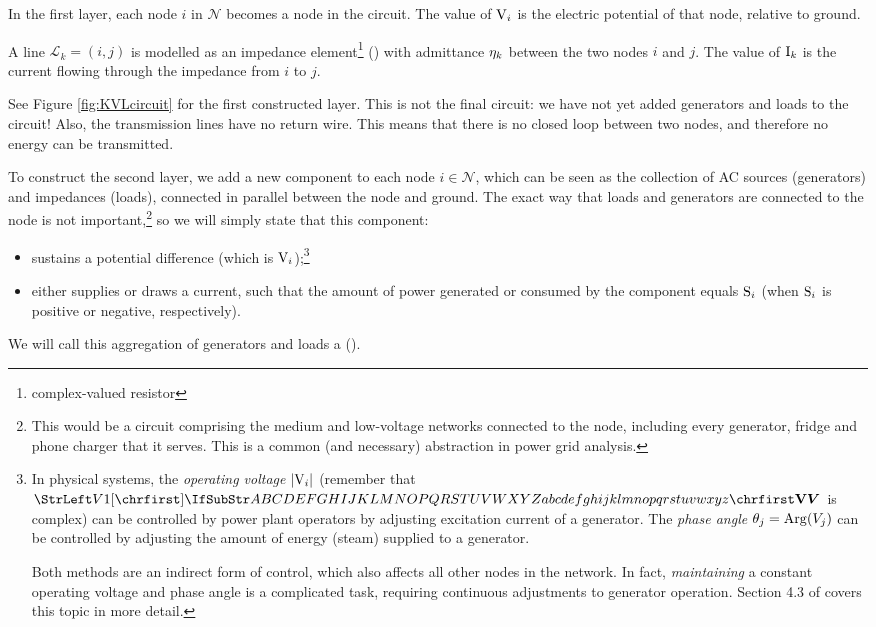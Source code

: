 \documentclass[main.tex]{subfiles}
\begin{document}
In the first layer, each node $i$ in $\mathcal{N}$ becomes a node in the circuit. The value of ${\mathrm{V}}_i$ is the electric potential of that node, relative to ground.

A line $\mathcal{L}_k=(i,j)$ is modelled as an impedance element\footnote{complex-valued resistor} (\inlineres) with admittance ${\mathrm{\eta}}_k$ between the two nodes $i$ and $j$. The value of ${\mathrm{I}}_k$ is the current flowing through the impedance from $i$ to $j$.

See Figure \ref{fig:KVLcircuit} for the first constructed layer. This is not the final circuit: we have not yet added generators and loads to the circuit! Also, the transmission lines have no return wire. This means that there is no closed loop between two nodes, and therefore no energy can be transmitted.

To construct the second layer, we add a new component to each node $i \in \mathcal{N}$, which can be seen as the collection of AC sources (generators) and impedances (loads), connected in parallel between the node and ground. The exact way that loads and generators are connected to the node is not important,\footnote{This would be a circuit comprising the medium and low-voltage networks connected to the node, including every generator, fridge and phone charger that it serves. This is a common (and necessary) abstraction in power grid analysis.} so we will simply state that this component:
\begin{itemize}
    \item sustains a potential difference (which is ${\mathrm{V}}_i$);\footnote{In physical systems, the \emph{operating voltage} $|{\mathrm{V}}_i|$ (remember that $\mat{V}$ is complex) can be controlled by power plant operators by adjusting excitation current of a generator. The \emph{phase angle} $\theta_j=\operatorname{Arg}(V_j)$ can be controlled by adjusting the amount of energy (steam) supplied to a generator.

    Both methods are an indirect form of control,
	which also affects    
    all other nodes in the network. In fact, \emph{maintaining} a constant operating voltage and phase angle is a complicated task, requiring continuous adjustments to generator operation. Section 4.3 of \cite{VonMeier2006} covers this topic in more detail.}
    \item either supplies or draws a current, such that the amount of power generated or consumed by the component equals ${\mathrm{S}}_i$ (when ${\mathrm{S}}_i$ is positive or negative, respectively).
\end{itemize}
We will call this aggregation of generators and loads a  (\inlineac).
\end{document}
